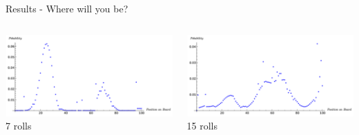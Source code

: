 \documentclass{beamer}
\begin{document}
\begin{frame}{Results - Where will you be?}
  \begin{columns}
      \begin{center}
      \includegraphics[width=\linewidth]{images/7plot}\\
      7 rolls
      \end{center}
      \begin{center}
      \includegraphics[width=\linewidth]{images/15plot}\\
      15 rolls
      \end{center}
  \end{columns}
\end{frame}
\end{document}
